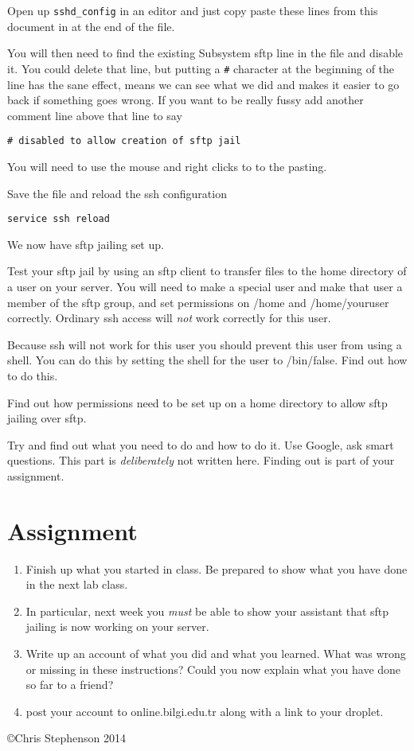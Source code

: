 \documentclass[12pt, a4paper]{article}
\begin{document}
Open up \verb|sshd_config| in an editor and just copy paste these lines from this document in at the end of the file.

You will then need to find the existing Subsystem sftp line in the file and disable it. You could delete that line, but putting a \verb|#| character at the beginning of the line has the sane effect, means we can  see what we did and makes it easier to go back if something goes wrong. If you want to be really fussy add another comment line above that line to say

\begin{verbatim}
# disabled to allow creation of sftp jail 
\end{verbatim}

You will need to use the mouse and right clicks to to the pasting.

Save the file and reload the ssh configuration

\begin{verbatim}
service ssh reload
\end{verbatim}

We now have sftp jailing set up. 

Test your sftp jail by using an sftp client to transfer files to the home directory of a user on your server. You will need to make a special user and make that user a member of the sftp group, and set permissions on /home and /home/youruser correctly. Ordinary ssh access will \emph{not} work correctly for this user.

Because ssh will not work for this user you should prevent this user from using a shell. You can do this by setting the shell for the user to /bin/false. Find out how to do this.

Find out how permissions need to be set up on a home directory to allow sftp jailing over sftp.


Try and find out what you need to do and how to do it. Use Google, ask smart questions. This part is \emph{deliberately} not written here. Finding out is part of your assignment.




\section*{Assignment}


\begin{enumerate}
\item Finish up what you started in class. Be prepared to show what you have done in the next lab class. 
\item In particular, next week you \emph{must} be able to show your assistant that sftp jailing is now working on your server.
\item Write up an account of what you did and what you learned. What was wrong or missing in these instructions? Could you now explain what you have done so far to a friend?
\item post your account to online.bilgi.edu.tr along with a link to your droplet.

\end{enumerate}

\copyright Chris Stephenson 2014
\end{document}
